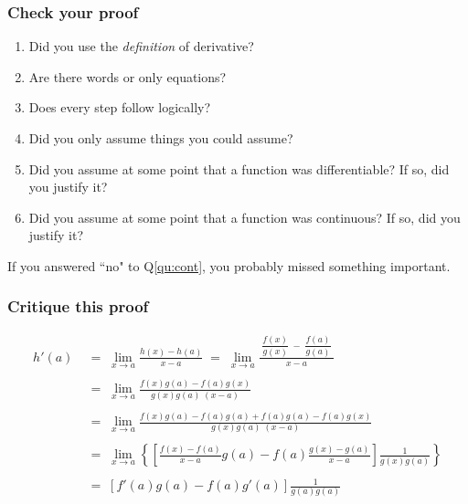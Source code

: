 \documentclass[14pt]{beamer}
\begin{document}
\begin{frame}[t]
	\frametitle{Check your proof}

	\begin{enumerate}
		\item Did you use the \emph{definition} of derivative?

		\item Are there words or only equations?

		\item Does every step follow logically?

		\item Did you only assume things you could assume?

		\item Did you assume at some point that a function was differentiable? If so,
			did you justify it?

		\item \label{qu:cont} Did you assume at some point that a function was continuous?
			If so, did you justify it?
	\end{enumerate}

	If you answered ``no" to Q\ref{qu:cont}, you probably missed something
	important.
\end{frame}

\begin{frame}[t]
	\fontsize{13}{13}\selectfont
	\frametitle{Critique this proof}
	\vspace{-1cm}
	\begin{align*}
		h'(a) \; & = \; \lim_{x \to a}\frac{h(x) - h(a) }{x - a}\; = \; \lim_{x \to a}\frac{\; \dfrac{f(x)}{g(x)} \; - \; \dfrac{f(a)}{g(a)} \;}{x-a} \\
		\         \\
		         & = \; \lim_{x \to a}\frac{f(x)g(a) - f(a)g(x)}{g(x)g(a) \; (x-a)}                                                                   \\
		\         \\
		         & = \; \lim_{x \to a}\frac{f(x)g(a) - f(a)g(a) + f(a)g(a) - f(a) g(x)}{g(x) g(a) \; (x-a)}                                           \\
		\         \\
		         & = \; \lim_{x \to a}\left\{ \left[ \frac{f(x) - f(a)}{x-a}g(a) - f(a) \frac{g(x) - g(a)}{x-a}\right] \frac{1}{g(x) g(a)}\right\}    \\
		\         \\
		         & = \; \left[ f'(a) g(a) - f(a) g'(a) \right] \frac{1}{g(a) g(a)}
	\end{align*}
\end{frame}
\end{document}

